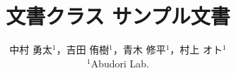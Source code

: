 \documentclass[platex,dvipdfmx]{rbproceedings}
\title{\pkg{RBProceedings}文書クラス サンプル文書}
\author{%
中村 勇太${}^{1}$，吉田 侑樹${}^{1}$，青木 修平${}^{1}$，村上 オト${}^{1}$\\
${}^{1}$Abudori Lab.
}
\begin{document}
\maketitle












\cite{JLREQ}



\end{document}
